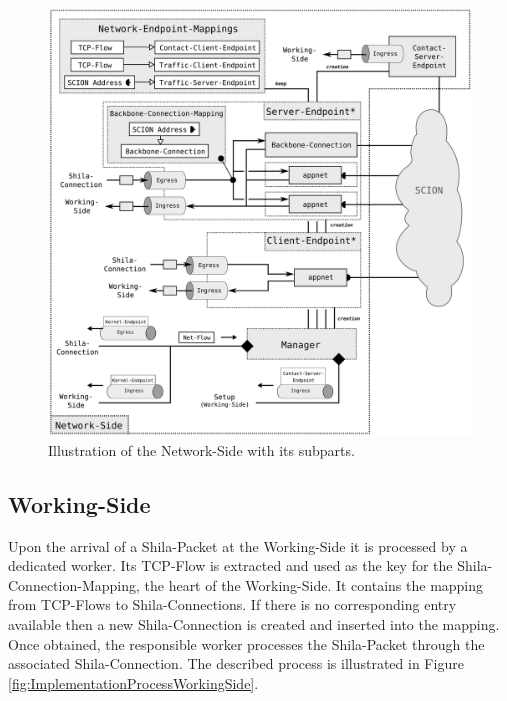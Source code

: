 \begin{figure}
	\begin{center}
		\def\svgwidth{1\textwidth}
		\includegraphics[scale=0.2]{../illustrations/implementation/ModulesNetworkSide.pdf}   
		\caption[Caption for the list of figures.]{Illustration of the Network-Side with its subparts.}
		\label{fig:ImplementationModulesNetworkSide}
	\end{center}
\end{figure}

\subsection{Working-Side}

Upon the arrival of a Shila-Packet at the Working-Side it is processed by a dedicated worker. Its TCP-Flow is extracted and used as the key for the Shila-Connection-Mapping, the heart of the Working-Side. It contains the mapping from TCP-Flows to Shila-Connections. If there is no corresponding entry available then a new Shila-Connection is created and inserted into the mapping. Once obtained, the responsible worker processes the Shila-Packet through the associated Shila-Connection. The described process is illustrated in Figure \ref{fig:ImplementationProcessWorkingSide}.

